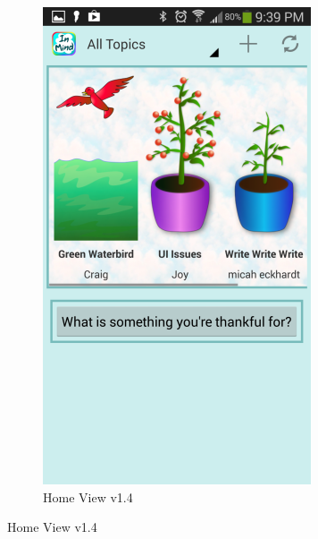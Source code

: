 \begin{figure}
    \begin{subfigure}[b]{0.4\textwidth}
      \includegraphics[width=\textwidth]{planter_final.png}
       \caption{Home View v1.4}
    \end{subfigure}
    \label{fig:home_screens}
  \end{figure}

